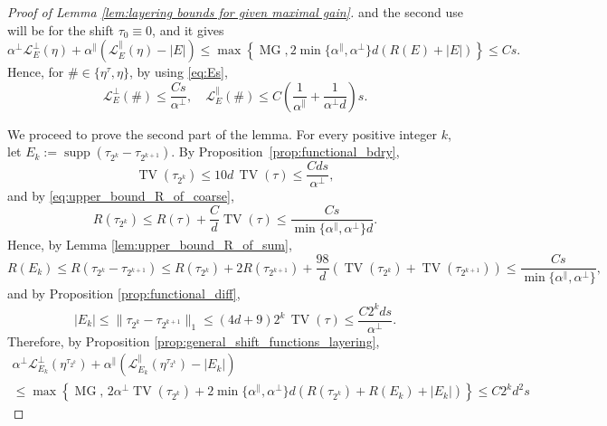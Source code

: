 \documentclass[11pt, reqno]{amsart}
\DeclareMathOperator{\supp}{supp}
\DeclareMathOperator{\TV}{TV}
\DeclareMathOperator{\MG}{MG}
\numberwithin{equation}{section}
\begin{document}
\begin{proof} [Proof of Lemma \ref{lem:layering bounds for given maximal gain}]
and the second use will be for the shift $\tau_0\equiv 0$, and it gives 
\begin{equation*}
\alpha^{\perp} \mathcal{L}^{\perp}_{E}(\eta)+\alpha^{\parallel} \left( \mathcal{L}^{\parallel}_{E}(\eta) -|E| \right)\leq \max\left\{ \MG, 2\min \{ \alpha^{\parallel}, \alpha^{\perp} \}d\left( R(E)+|E| \right) \right\}\leq C s.
\end{equation*}
Hence, for $\# \in \{\eta^{\tau},\eta\}$, by using \eqref{eq:Es}, 
\begin{equation*}
\mathcal{L}^{\perp}_{E}(\#) \leq  \frac{C s}{\alpha^{\perp}}  ,
\quad \mathcal{L}^{\parallel}_{E} (\#) \leq C\left(\frac{1}{\alpha^{\parallel}}+\frac{1}{\alpha^{\perp}d}\right)s.
\end{equation*}

We proceed to prove the second part of the lemma. 
For every positive integer $k$, let $E_k:=\supp \left(\tau_{2^k}-\tau_{2^{k+1}} \right)$.
By Proposition~\ref{prop:functional_bdry},
\begin{equation}\label{eq:TVks}
\TV(\tau_{2^k})\leq 10d\, \TV(\tau)\leq \frac{C d s}{\alpha^{\perp}},\end{equation}
and by \eqref{eq:upper_bound_R_of_coarse},
\begin{equation}\label{eq:Rks}
R(\tau_{2^k})\leq R(\tau)+\frac{C}{d}\TV(\tau)\leq \frac{Cs}{\min\{\alpha^{\parallel},\alpha^{\perp}\}d}.
\end{equation}
Hence, by Lemma \ref{lem:upper_bound_R_of_sum}, 
$$
R\left(E_k\right)\leq R\left(\tau_{2^k}-\tau_{2^{k+1}}\right)\leq R\left(\tau_{2^k}\right)+2R\left(\tau_{2^{k+1}}\right)+\frac{98}{d}\left(\TV\left(\tau_{2^k}\right)+\TV\left(\tau_{2^{k+1}}\right)\right)\leq \frac{C s}{\min\{\alpha^{\parallel},\alpha^{\perp}\}},
$$
and by Proposition \ref{prop:functional_diff},
\begin{equation}\label{eq:Eks}
\lvert E_k\rvert\leq\lVert \tau_{2^k}-\tau_{2^{k+1}}\rVert_1
\leq (4d+9)2^k\, \TV(\tau)\leq\frac{C 2^k d s}{\alpha^{\perp}}. 
\end{equation}
Therefore, by Proposition \ref{prop:general_shift_functions_layering},
\begin{multline*}
\alpha^{\perp}\mathcal{L}^{\perp}_{E_k}(\eta^{\tau_{2^k}})+ \alpha^{\parallel} \left( \mathcal{L}^{\parallel}_{E_k}(\eta^{\tau_{2^k}}) -|E_k| \right) \\
\leq \max\left\{  \MG,\, 2\alpha^{\perp}\TV\left(\tau_{2^k}\right)+2\min \{ \alpha^{\parallel}, \alpha^{\perp} \}d\left(R(\tau_{2^k})+R\left(E_k\right)+\lvert E_k\rvert\right)\right\}\leq C 2^k d^2 s

\end{multline*}
\end{proof}
\end{document}
